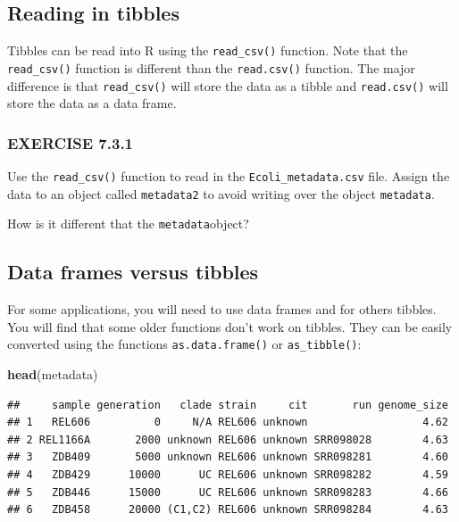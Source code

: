 \documentclass[
]{book}
\newenvironment{Shaded}{\begin{snugshade}}{\end{snugshade}}
\newcommand{\FunctionTok}[1]{\textcolor[rgb]{0.13,0.29,0.53}{\textbf{#1}}}
\newcommand{\NormalTok}[1]{#1}
\begin{document}
\subsection*{Reading in tibbles}\label{reading-in-tibbles}

Tibbles can be read into R using the \texttt{read\_csv()} function. Note that the \texttt{read\_csv()} function is different than the \texttt{read.csv()} function. The major difference is that \texttt{read\_csv()} will store the data as a tibble and \texttt{read.csv()} will store the data as a data frame.

\subsubsection*{EXERCISE 7.3.1}\label{exercise-7.3.1}

Use the \texttt{read\_csv()} function to read in the \texttt{Ecoli\_metadata.csv} file. Assign the data to an object called \texttt{metadata2} to avoid writing over the object \texttt{metadata}.

How is it different that the \texttt{metadata}object?

\subsection*{Data frames versus tibbles}\label{data-frames-versus-tibbles}

For some applications, you will need to use data frames and for others tibbles. You will find that some older functions don't work on tibbles. They can be easily converted using the functions \texttt{as.data.frame()} or \texttt{as\_tibble()}:

\begin{Shaded}
\begin{Highlighting}[]
\FunctionTok{head}\NormalTok{(metadata)}
\end{Highlighting}
\end{Shaded}

\begin{verbatim}
##     sample generation   clade strain     cit       run genome_size
## 1   REL606          0     N/A REL606 unknown                  4.62
## 2 REL1166A       2000 unknown REL606 unknown SRR098028        4.63
## 3   ZDB409       5000 unknown REL606 unknown SRR098281        4.60
## 4   ZDB429      10000      UC REL606 unknown SRR098282        4.59
## 5   ZDB446      15000      UC REL606 unknown SRR098283        4.66
## 6   ZDB458      20000 (C1,C2) REL606 unknown SRR098284        4.63
\end{verbatim}
\end{document}
